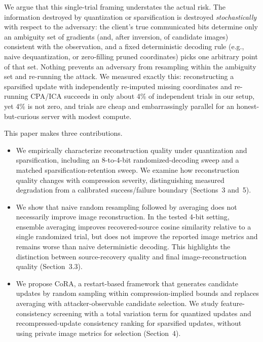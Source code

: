 \documentclass{article}
\begin{document}
We argue that this single-trial framing understates the actual risk. The
information destroyed by quantization or sparsification is destroyed
\emph{stochastically} with respect to the adversary: the client's true
communicated bits determine only an ambiguity set of gradients (and, after
inversion, of candidate images) consistent with the observation, and a fixed
deterministic decoding rule (e.g., naive dequantization, or zero-filling
pruned coordinates) picks one arbitrary point of that set. Nothing prevents
an adversary from resampling within the ambiguity set and re-running the
attack. We measured exactly this: reconstructing a sparsified update with
independently re-imputed missing coordinates and re-running CPA/ICA succeeds
in only about 4\% of independent trials in our setup, yet 4\% is not zero,
and trials are cheap and embarrassingly parallel for an honest-but-curious
server with modest compute.

This paper makes three contributions.
\begin{itemize}
  \item We empirically characterize reconstruction quality under
  quantization and sparsification, including an 8-to-4-bit
  randomized-decoding sweep and a matched sparsification-retention
  sweep. We examine how reconstruction quality changes with
  compression severity, distinguishing measured degradation from
  a calibrated success/failure boundary (Sections~3 and~5).

  \item We show that naive random resampling followed by averaging
  does not necessarily improve image reconstruction. In the tested
  4-bit setting, ensemble averaging improves recovered-source cosine
  similarity relative to a single randomized trial, but does not
  improve the reported image metrics and remains worse than naive
  deterministic decoding. This highlights the distinction between
  source-recovery quality and final image-reconstruction quality
  (Section~3.3).

  \item We propose CoRA, a restart-based framework that generates
  candidate updates by random sampling within compression-implied
  bounds and replaces averaging with attacker-observable candidate
  selection. We study feature-consistency screening with a total
  variation term for quantized updates and recompressed-update
  consistency ranking for sparsified updates, without using private
  image metrics for selection (Section~4).
\end{itemize}
\end{document}
